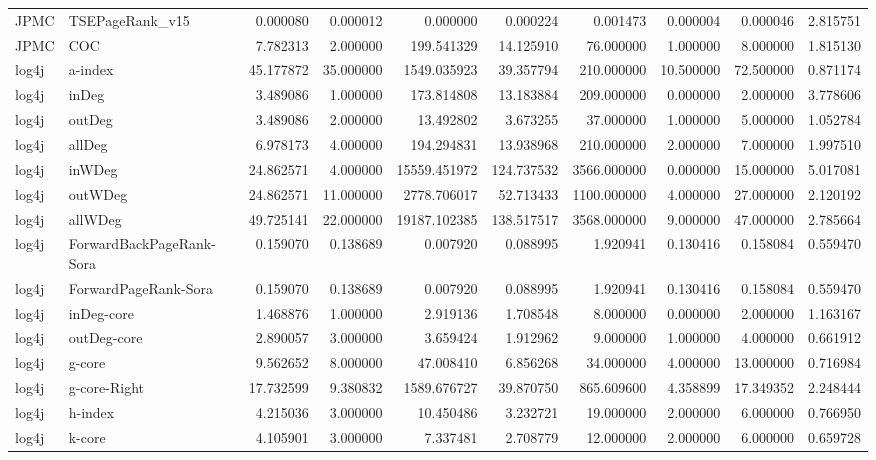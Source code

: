 \begin{tabular}{llrrrrrrrr}
JPMC & TSEPageRank_v15 & 0.000080 & 0.000012 & 0.000000 & 0.000224 & 0.001473 & 0.000004 & 0.000046 & 2.815751 \\
JPMC & COC & 7.782313 & 2.000000 & 199.541329 & 14.125910 & 76.000000 & 1.000000 & 8.000000 & 1.815130 \\
log4j & a-index & 45.177872 & 35.000000 & 1549.035923 & 39.357794 & 210.000000 & 10.500000 & 72.500000 & 0.871174 \\
log4j & inDeg & 3.489086 & 1.000000 & 173.814808 & 13.183884 & 209.000000 & 0.000000 & 2.000000 & 3.778606 \\
log4j & outDeg & 3.489086 & 2.000000 & 13.492802 & 3.673255 & 37.000000 & 1.000000 & 5.000000 & 1.052784 \\
log4j & allDeg & 6.978173 & 4.000000 & 194.294831 & 13.938968 & 210.000000 & 2.000000 & 7.000000 & 1.997510 \\
log4j & inWDeg & 24.862571 & 4.000000 & 15559.451972 & 124.737532 & 3566.000000 & 0.000000 & 15.000000 & 5.017081 \\
log4j & outWDeg & 24.862571 & 11.000000 & 2778.706017 & 52.713433 & 1100.000000 & 4.000000 & 27.000000 & 2.120192 \\
log4j & allWDeg & 49.725141 & 22.000000 & 19187.102385 & 138.517517 & 3568.000000 & 9.000000 & 47.000000 & 2.785664 \\
log4j & ForwardBackPageRank-Sora & 0.159070 & 0.138689 & 0.007920 & 0.088995 & 1.920941 & 0.130416 & 0.158084 & 0.559470 \\
log4j & ForwardPageRank-Sora & 0.159070 & 0.138689 & 0.007920 & 0.088995 & 1.920941 & 0.130416 & 0.158084 & 0.559470 \\
log4j & inDeg-core & 1.468876 & 1.000000 & 2.919136 & 1.708548 & 8.000000 & 0.000000 & 2.000000 & 1.163167 \\
log4j & outDeg-core & 2.890057 & 3.000000 & 3.659424 & 1.912962 & 9.000000 & 1.000000 & 4.000000 & 0.661912 \\
log4j & g-core & 9.562652 & 8.000000 & 47.008410 & 6.856268 & 34.000000 & 4.000000 & 13.000000 & 0.716984 \\
log4j & g-core-Right & 17.732599 & 9.380832 & 1589.676727 & 39.870750 & 865.609600 & 4.358899 & 17.349352 & 2.248444 \\
log4j & h-index & 4.215036 & 3.000000 & 10.450486 & 3.232721 & 19.000000 & 2.000000 & 6.000000 & 0.766950 \\
log4j & k-core & 4.105901 & 3.000000 & 7.337481 & 2.708779 & 12.000000 & 2.000000 & 6.000000 & 0.659728 \\

\end{tabular}
